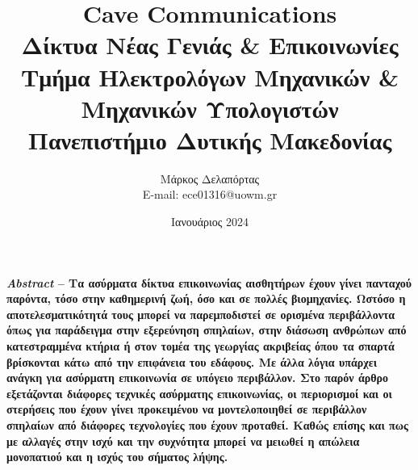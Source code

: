 \documentclass[12pt]{article}
\title{ \textsf{ Cave Communications}\\
    \textsf{Δίκτυα Νέας Γενιάς \& Επικοινωνίες}\\
    \textsf{\Large Τμήμα Ηλεκτρολόγων Μηχανικών \& Μηχανικών Υπολογιστών}\\
    \textsf{\large Πανεπιστήμιο Δυτικής Μακεδονίας}
} \author{\textsf{Μάρκος Δελαπόρτας} \\ E-mail: ece01316@uowm.gr}
\date{\textsf{Ιανουάριος 2024}}
\begin{document}
\maketitle

\textbf{ \textit{Abstract} -- Τα ασύρματα δίκτυα επικοινωνίας αισθητήρων
    έχουν γίνει πανταχού παρόντα, τόσο στην καθημερινή ζωή, όσο και σε πολλές
    βιομηχανίες. Ωστόσο η αποτελεσματικότητά τους μπορεί να παρεμποδιστεί σε ορισμένα
    περιβάλλοντα όπως για παράδειγμα στην εξερεύνηση σπηλαίων, στην διάσωση ανθρώπων
    από κατεστραμμένα κτήρια ή στον τομέα της γεωργίας ακριβείας όπου τα σπαρτά
    βρίσκονται κάτω από την επιφάνεια του εδάφους. Με άλλα λόγια υπάρχει ανάγκη για
    ασύρματη επικοινωνία σε υπόγειο περιβάλλον. Στο παρόν άρθρο εξετάζονται διάφορες
    τεχνικές ασύρματης επικοινωνίας, οι περιορισμοί και οι στερήσεις που έχουν γίνει
    προκειμένου να μοντελοποιηθεί σε περιβάλλον σπηλαίων από διάφορες τεχνολογίες που
    έχουν προταθεί. Καθώς επίσης και πως με αλλαγές στην ισχύ και την συχνότητα μπορεί
    να μειωθεί η απώλεια μονοπατιού και η ισχύς του σήματος λήψης. }


\tableofcontents
\begin{multicols*}{2}\end{multicols*}

\begin{multicols*}{2}\printbibliography\end{multicols*}
\end{document}
